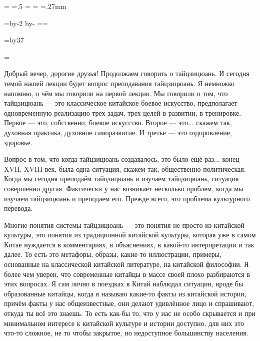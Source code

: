 \pdfpagewidth=297mm
\pdfpageheight=210mm
\pdfhorigin=1in
\pdfvorigin=0pt

\shhtotal=\pdfpagewidth
\htotal=.5\shhtotal
\vtotal=\pdfpageheight
\shoutline=0pt
\shstaplewidth=0pt
\shcrop=0pt
\shfootline={}
\shthickness=.27mm
\qtwopages \shipout\vbox{}

\horigin=10mm
\hsize=\htotal \advance\hsize by-2\horigin
\advance\hsize by-\QUIRE
\output={\ifodd\pageno\else\hoffset=\QUIRE\fi \plainoutput}

\vorigin=7mm
\vsize=\topskip \advance\vsize by37\baselineskip

\footline={\line{\hss\tenrm\folio\hss}}


Добрый вечер, дорогие друзья! Продолжаем говорить о 
тайцзицюань.  И сегодня темой нашей лекции будет 
вопрос преподавания тайцзицюань. Я немножко напомню,
о чём мы говорили на первой лекции. Мы говорили о том,  
что тайцзицюань --- это классическое китайское боевое
искусство,  предполагает одновременную реализацию 
трех задач, трех целей в развитии, в тренировке. Первое 
--- это, собственно, боевое искусство.  Второе --- это... 
скажем так,  духовная практика, духовное саморазвитие. 
И третье --- это оздоровление,  здоровье.

Вопрос в том, что когда тайцзицюань создавалось, это было ещё
раз... конец XVII, XVIII век, была одна ситуация,  скажем так, 
общественно-политическая. Когда мы сегодня преподаём 
тайцзицюань и изучаем тайцзицюань, ситуация 
совершенно другая.  Фактически у нас возникает 
несколько проблем, когда мы изучаем тайцзицюань и 
преподаем его. Прежде всего, это проблема культурного 
перевода.

Многие понятия системы тайцзицюань ---  это 
понятия не просто из китайской культуры, это понятия
из традиционной китайской культуры,  которая уже в 
самом Китае нуждается в комментариях, в объяснениях, 
в какой-то интерпретации и так далее.  То есть это 
метафоры,  образы,  какие-то иллюстрации, примеры, 
основанные на классической китайской литературе,  на 
китайской философии.  Я более чем уверен, что 
современные китайцы в массе своей плохо разбираются в 
этих вопросах. Я сам лично в поездках в Китай наблюдал 
ситуации,  вроде бы образованные китайцы, когда я 
называю какие-то факты из китайской истории, причём 
факты у нас общеизвестные, они делают удивлённое лицо 
и спрашивают, откуда ты всё это знаешь.  То есть как-бы 
то,  что у нас не особо скрывается и при минимальном 
интересе к китайской культуре и истории доступно, для них это 
что-то сложное, не то чтобы закрытое, но недоступное 
большинству населения.

